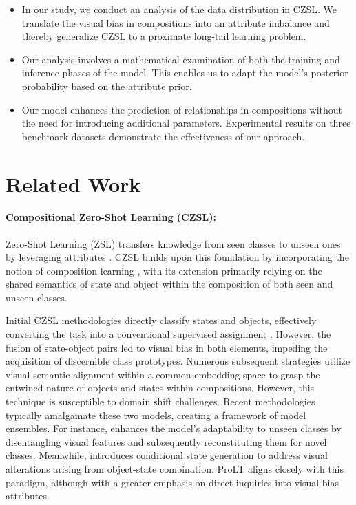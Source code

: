 \documentclass[letterpaper]{article} %
\theoremstyle{definition}
\begin{document}
\begin{itemize}
\item In our study, we conduct an analysis of the data distribution in CZSL. We translate the visual bias in compositions into an attribute imbalance and thereby generalize CZSL to a proximate long-tail learning problem. 
\item Our analysis involves a mathematical examination of both the training and inference phases of the model. This enables us to adapt the model's posterior probability based on the attribute prior.
\item Our model enhances the prediction of relationships in compositions without the need for introducing additional parameters. Experimental results on three benchmark datasets demonstrate the effectiveness of our approach.
\end{itemize}


\section{Related Work} \label{sec.related}

\paragraph{Compositional Zero-Shot Learning (CZSL):} Zero-Shot Learning (ZSL) transfers knowledge from seen classes to unseen ones by leveraging attributes \cite{akata2013label, lampert2013attribute, parikh2011relative, frome2013devise, akata2015evaluation}. CZSL \cite{atzmon2020causal, yang2022decomposable,nagarajan2018attributes,wang2019task} builds upon this foundation by incorporating the notion of composition learning \cite{hoffman1984parts}, with its extension primarily relying on the shared semantics of state and object within the composition of both seen and unseen classes.

Initial CZSL methodologies directly classify states and objects, effectively converting the task into a conventional supervised assignment \cite{misra2017red, chen2014inferring, yang2020learning,lu2016visual,li2022siamese}. However, the fusion of state-object pairs led to visual bias in both elements, impeding the acquisition of discernible class prototypes. Numerous subsequent strategies utilize visual-semantic alignment within a common embedding space \cite{naeem2021learning,mancini2022learning,mancini2021open} to grasp the entwined nature of objects and states within compositions. However, this technique is susceptible to domain shift challenges. Recent methodologies typically amalgamate these two models, creating a framework of model ensembles. For instance, \citet{saini2022disentangling} enhances the model's adaptability to unseen classes by disentangling visual features and subsequently reconstituting them for novel classes. Meanwhile, \citet{wang2023learning} introduces conditional state generation to address visual alterations arising from object-state combination. ProLT aligns closely with this paradigm, although with a greater emphasis on direct inquiries into visual bias attributes.
\end{document}

